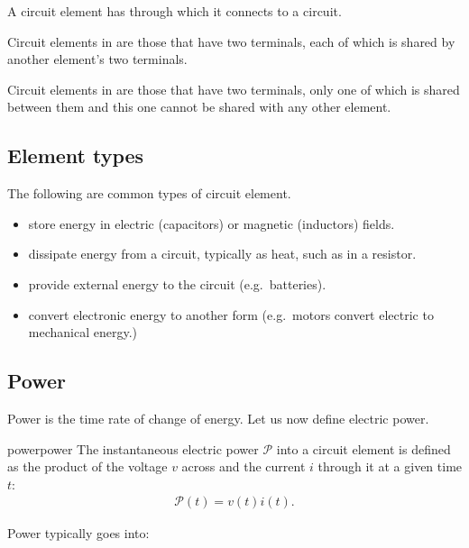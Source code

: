 \documentclass[electronics.tex]{subfiles}
\begin{document}
A circuit element has  through which it connects to a circuit.
\tags{}

Circuit elements in  are those that have two terminals, each of which is shared by another element's two terminals.
\tags{}

Circuit elements in  are those that have two terminals, only one of which is shared between them and this one cannot be shared with any other element.
\tags{}

\subsection{Element types}
\tags{}

The following are common types of circuit element.
\begin{itemize}
  \item {} store energy in electric (capacitors) or magnetic (inductors) fields.
  \item {} dissipate energy from a circuit, typically as heat, such as in a resistor.
  \item {} provide external energy to the circuit (e.g.\ batteries).
  \item {} convert electronic energy to another form (e.g.\ motors convert electric to mechanical energy.)
\end{itemize}

\subsection{Power}
\tags{}

Power is the time rate of change of energy.
Let us now define electric power.
\tags{}

\begin{Definition}{power}{power}%
  The instantaneous electric power $\mathcal{P}$ into a circuit element is defined as the product of the voltage $v$ across and the current $i$ through it at a given time $t$:
  \begin{align}
    \mathcal{P}(t) = v(t) i(t).
  \end{align}
\end{Definition}

Power typically goes into:
\tags{}
\end{document}
